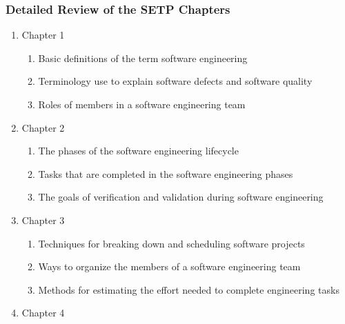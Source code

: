 \documentclass[11pt]{article}
\begin{document}

\subsubsection*{Detailed Review of the SETP Chapters}

\begin{enumerate}
  \itemsep 0in

  \item Chapter 1

    \vspace*{-.5em}

    \begin{enumerate}
      \itemsep 0in
      \item Basic definitions of the term software engineering
      \item Terminology use to explain software defects and software quality
      \item Roles of members in a software engineering team
    \end{enumerate}

  \item Chapter 2

    \vspace*{-.5em}

    \begin{enumerate}
      \itemsep 0in
      \item The phases of the software engineering lifecycle
      \item Tasks that are completed in the software engineering phases
      \item The goals of verification and validation during software engineering
    \end{enumerate}

  \item Chapter 3

    \begin{enumerate}
      \itemsep 0in
      \item Techniques for breaking down and scheduling software projects
      \item Ways to organize the members of a software engineering team
      \item Methods for estimating the effort needed to complete engineering
        tasks
    \end{enumerate}

  \item Chapter 4


\end{enumerate}
\end{document}
